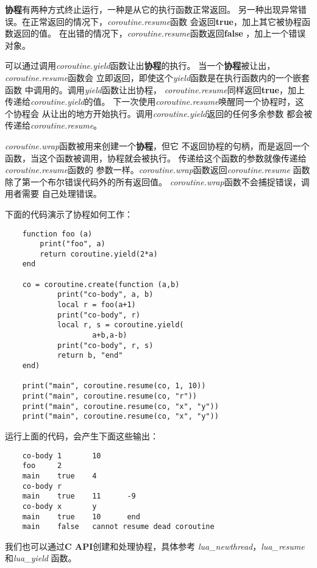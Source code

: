 \documentclass{ctexart}
\begin{document}
\textbf{协程}有两种方式终止运行，一种是从它的执行函数正常返回。
另一种出现异常错误。在正常返回的情况下，\emph{coroutine.resume}函数
会返回\textbf{true}，加上其它被协程函数返回的值。
在出错的情况下，\emph{coroutine.resume}函数返回\textbf{false}
，加上一个错误对象。

可以通过调用\emph{coroutine.yield}函数让出\textbf{协程}的执行。
当一个\textbf{协程}被让出，\emph{coroutine.resume}函数会
立即返回，即使这个\emph{yield}函数是在执行函数内的一个嵌套函数
中调用的。调用\emph{yield}函数让出协程，
\emph{coroutine.resume}同样返回\textbf{true}，加上
传递给\emph{coroutine.yield}的值。
下一次使用\emph{coroutine.resume}唤醒同一个协程时，这个协程会
从让出的地方开始执行。调用\emph{coroutine.yield}返回的任何多余参数
都会被传递给\emph{coroutine.resume}。

\emph{coroutine.wrap}函数被用来创建一个\textbf{协程}，但它
不返回协程的句柄，而是返回一个函数，当这个函数被调用，协程就会被执行。
传递给这个函数的参数就像传递给\emph{coroutine.resume}函数的
参数一样。\emph{coroutine.wrap}函数返回\emph{coroutine.resume}
函数除了第一个布尔错误代码外的所有返回值。
\emph{coroutine.wrap}函数不会捕捉错误，调用者需要
自己处理错误。

下面的代码演示了协程如何工作：

\lstset{language=C}
\begin{lstlisting}
	function foo (a)
		print("foo", a)
		return coroutine.yield(2*a)
	end

	co = coroutine.create(function (a,b)
			print("co-body", a, b)
			local r = foo(a+1)
			print("co-body", r)
			local r, s = coroutine.yield(
					a+b,a-b)
			print("co-body", r, s)
			return b, "end"
	end)
     
	print("main", coroutine.resume(co, 1, 10))
	print("main", coroutine.resume(co, "r"))
	print("main", coroutine.resume(co, "x", "y"))
	print("main", coroutine.resume(co, "x", "y"))
\end{lstlisting}

运行上面的代码，会产生下面这些输出：

\lstset{language=C}
\begin{lstlisting}
	co-body 1       10
	foo     2
	main    true    4
	co-body r
	main    true    11      -9
	co-body x       y
	main    true    10      end
	main    false   cannot resume dead coroutine
\end{lstlisting}

我们也可以通过\textbf{C API}创建和处理协程，具体参考
\emph{lua\_newthread}，\emph{lua\_resume}和\emph{lua\_yield}
函数。
\end{document}
